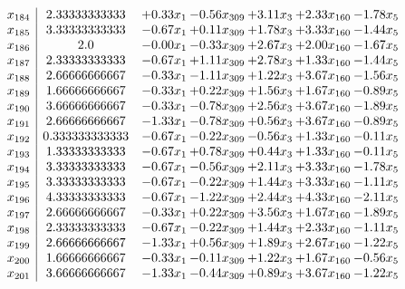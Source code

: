 \documentclass[8pt]{article}
\begin{document}
\[\begin{array}{c| c c@{\hskip 2pt} c@{\hskip 2pt} c@{\hskip 2pt} c@{\hskip 2pt} c@{\hskip 2pt} }
 x_{184}   &  2.33333333333 & +  0.33 x_{1} & -0.56 x_{309} & +  3.11 x_{3} & +  2.33 x_{160} & -1.78 x_{5}\\
 x_{185}   &  3.33333333333 & -0.67 x_{1} & +  0.11 x_{309} & +  1.78 x_{3} & +  3.33 x_{160} & -1.44 x_{5}\\
 x_{186}   &  2.0 & -0.00 x_{1} & -0.33 x_{309} & +  2.67 x_{3} & +  2.00 x_{160} & -1.67 x_{5}\\
 x_{187}   &  2.33333333333 & -0.67 x_{1} & +  1.11 x_{309} & +  2.78 x_{3} & +  1.33 x_{160} & -1.44 x_{5}\\
 x_{188}   &  2.66666666667 & -0.33 x_{1} & -1.11 x_{309} & +  1.22 x_{3} & +  3.67 x_{160} & -1.56 x_{5}\\
 x_{189}   &  1.66666666667 & -0.33 x_{1} & +  0.22 x_{309} & +  1.56 x_{3} & +  1.67 x_{160} & -0.89 x_{5}\\
 x_{190}   &  3.66666666667 & -0.33 x_{1} & -0.78 x_{309} & +  2.56 x_{3} & +  3.67 x_{160} & -1.89 x_{5}\\
 x_{191}   &  2.66666666667 & -1.33 x_{1} & -0.78 x_{309} & +  0.56 x_{3} & +  3.67 x_{160} & -0.89 x_{5}\\
 x_{192}   &  0.333333333333 & -0.67 x_{1} & -0.22 x_{309} & -0.56 x_{3} & +  1.33 x_{160} & -0.11 x_{5}\\
 x_{193}   &  1.33333333333 & -0.67 x_{1} & +  0.78 x_{309} & +  0.44 x_{3} & +  1.33 x_{160} & -0.11 x_{5}\\
 x_{194}   &  3.33333333333 & -0.67 x_{1} & -0.56 x_{309} & +  2.11 x_{3} & +  3.33 x_{160} & -1.78 x_{5}\\
 x_{195}   &  3.33333333333 & -0.67 x_{1} & -0.22 x_{309} & +  1.44 x_{3} & +  3.33 x_{160} & -1.11 x_{5}\\
 x_{196}   &  4.33333333333 & -0.67 x_{1} & -1.22 x_{309} & +  2.44 x_{3} & +  4.33 x_{160} & -2.11 x_{5}\\
 x_{197}   &  2.66666666667 & -0.33 x_{1} & +  0.22 x_{309} & +  3.56 x_{3} & +  1.67 x_{160} & -1.89 x_{5}\\
 x_{198}   &  2.33333333333 & -0.67 x_{1} & -0.22 x_{309} & +  1.44 x_{3} & +  2.33 x_{160} & -1.11 x_{5}\\
 x_{199}   &  2.66666666667 & -1.33 x_{1} & +  0.56 x_{309} & +  1.89 x_{3} & +  2.67 x_{160} & -1.22 x_{5}\\
 x_{200}   &  1.66666666667 & -0.33 x_{1} & -0.11 x_{309} & +  1.22 x_{3} & +  1.67 x_{160} & -0.56 x_{5}\\
 x_{201}   &  3.66666666667 & -1.33 x_{1} & -0.44 x_{309} & +  0.89 x_{3} & +  3.67 x_{160} & -1.22 x_{5}\\

\end{array}\]
\end{document}
